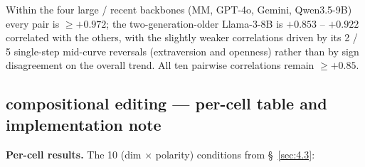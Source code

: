 Within the four large / recent backbones (MM, GPT-4o, Gemini, Qwen3.5-9B) every pair is $\geq +0.972$; the two-generation-older Llama-3-8B is $+0.853$ -- $+0.922$ correlated with the others, with the slightly weaker correlations driven by its 2 / 5 single-step mid-curve reversals (extraversion and openness) rather than by sign disagreement on the overall trend. All ten pairwise correlations remain $\geq +0.85$.

\subsection{compositional editing --- per-cell table and implementation note}
\label{app:A.8}

\textbf{Per-cell results.} The 10 (dim $\times$ polarity) conditions from \S~\ref{sec:4.3}:

\begin{table}[t]
\centering
{}
\caption{Compositional editing from worst-case opposite-pole corpora. Starting from the opposite-polarity atom set and incrementally adding 0/5/10/15/20 target-pole atoms produces a target-direction Mini-IPIP move on all 10 (dim$\times$polarity) cells, with the target $\Delta$ at least $2\times$ the worst off-target $\Delta$ in 4 / 10 cells.}
\label{tab:rq3-compositional}
\end{table}


